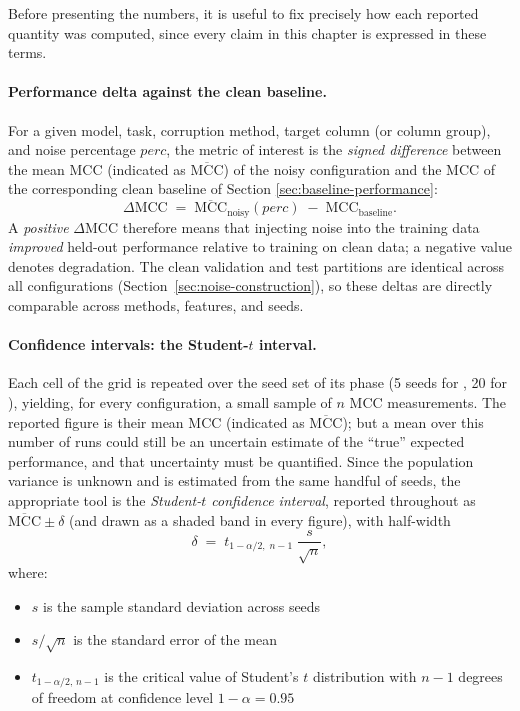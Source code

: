 \documentclass[../main.tex]{subfiles}
\begin{document}
Before presenting the numbers, it is useful to fix precisely how each reported quantity was computed, since every claim in this chapter is expressed in these terms.

\paragraph{Performance delta against the clean baseline.}
For a given model, task, corruption method, target column (or column group), and noise percentage $perc$, the metric of interest is the \emph{signed difference} between the mean MCC (indicated as $\overline{\mathrm{MCC}}$) of the noisy configuration  and the MCC of the corresponding clean baseline of Section \ref{sec:baseline-performance}:
\[
    \Delta\mathrm{MCC} \;=\; \overline{\mathrm{MCC}}_{\text{noisy}}(perc) \;-\; \mathrm{MCC}_{\text{baseline}}.
\]
A \emph{positive} $\Delta\mathrm{MCC}$ therefore means that injecting noise into the training data \emph{improved} held-out performance relative to training on clean data; a negative value denotes degradation. The clean validation and test partitions are identical across all configurations (Section~\ref{sec:noise-construction}), so these deltas are directly comparable across methods, features, and seeds.

\paragraph{Confidence intervals: the Student-$t$ interval.}
Each cell of the grid is repeated over the seed set of its phase (5 seeds for , 20 for ), yielding, for every configuration, a small sample of $n$ MCC measurements. The reported figure is their mean $\mathrm{MCC}$ (indicated as $\overline{\mathrm{MCC}}$); but a mean over this number of runs could still be an uncertain estimate of the ``true'' expected performance, and that uncertainty must be quantified. Since the population variance is unknown and is estimated from the same handful of seeds, the appropriate tool is the \emph{Student-$t$ confidence interval}, reported throughout as $\overline{\mathrm{MCC}} \pm \delta$ (and drawn as a shaded band in every figure), with half-width
\[
    \delta \;=\; t_{1-\alpha/2,\;n-1}\;\frac{s}{\sqrt{n}},
\]
where:
\begin{itemize}
    \item $s$ is the sample standard deviation across seeds
    \item $s/\sqrt{n}$ is the standard error of the mean
    \item $t_{1-\alpha/2,\,n-1}$ is the critical value of Student's $t$ distribution with $n-1$ degrees of freedom at confidence level $1-\alpha = 0.95$
\end{itemize}
\end{document}
